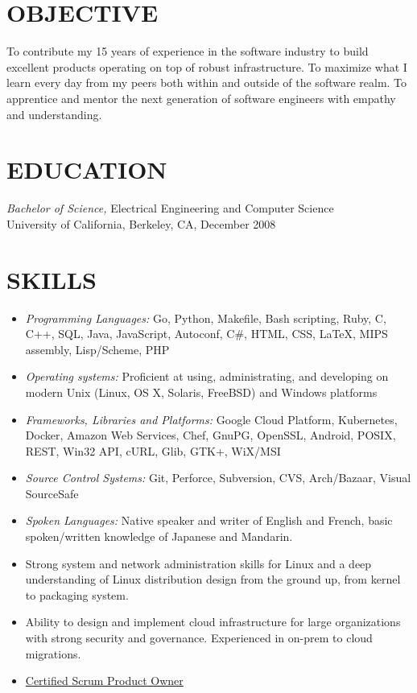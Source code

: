 \documentclass[overlapped,line,margin]{res}
\begin{document}
\address{
   Queens, NY, USA
   +1 (510) 646-0724
   \href{https://github.com/joshk0}{joshk0}
   \href{https://linkedin.com/in/joshk0}{joshk0}
   last updated \href{https://circleci.com/gh/joshk0/resume}{\today}
}

\begin{resume}

\section{OBJECTIVE}
To contribute my 15 years of experience in the software industry to
build excellent products operating on top of robust infrastructure.
To maximize what I learn every day from my peers both within and outside
of the software realm.
To apprentice and mentor the next generation of software engineers with
empathy and understanding.

\section{EDUCATION} \textit{Bachelor of Science,} Electrical Engineering and Computer Science \\
  University of California, Berkeley, CA, December 2008

\section{SKILLS}
\begin{itemize}
\item \textit{Programming Languages:} 
  Go, Python, Makefile, Bash scripting, Ruby, C, C++, SQL, Java, JavaScript,
  Autoconf, C\#, HTML, CSS, \LaTeX, MIPS assembly, Lisp/Scheme, PHP
\item \textit{Operating systems:}
  Proficient at using, administrating, and developing on modern Unix (Linux,
  OS X, Solaris, FreeBSD) and Windows platforms
\item \textit{Frameworks, Libraries and Platforms:}
  Google Cloud Platform, Kubernetes, Docker, Amazon Web Services, Chef,
  GnuPG, OpenSSL, Android, POSIX, REST, Win32 API, cURL, Glib, GTK+, WiX/MSI
\item \textit{Source Control Systems:}
  Git, Perforce, Subversion, CVS, Arch/Bazaar, Visual SourceSafe
\item \textit{Spoken Languages:}
  Native speaker and writer of English and French,
  basic spoken/written knowledge of Japanese and Mandarin.
\item Strong system and network administration skills for Linux and a
  deep understanding of Linux distribution design from the ground up, from
  kernel to packaging system.
\item Ability to design and implement cloud infrastructure for large
  organizations with strong security and governance. Experienced in
  on-prem to cloud migrations.
\item \href{http://bcert.me/sfcqbkgtf}{Certified Scrum Product Owner}
\end{itemize}


\end{resume}
\end{document}
